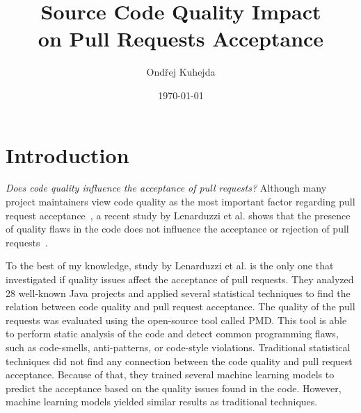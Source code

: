 \documentclass[digital,oneside,oldtable,nolof,nolot,nocover]{fithesis4}
\author{Ondřej Kuhejda}
\date{\today}
\title{Source Code Quality Impact \\ on Pull Requests Acceptance}
\begin{document}
\chapter{Introduction}
\label{sec:org70c3bc9}
\emph{Does code quality influence the acceptance of pull requests?} Although many
project maintainers view code quality as the most important factor regarding
pull request acceptance~\cite{integrator}, a recent study by Lenarduzzi et al.
shows that the presence of quality flaws in the code does not influence the
acceptance or rejection of pull requests~\cite{quality}.

To the best of my knowledge, study by Lenarduzzi et al. is the only one that
investigated if quality issues affect the acceptance of pull requests. They
analyzed 28 well-known Java projects and applied several statistical
techniques to find the relation between code quality and pull request
acceptance. The quality of the pull requests was evaluated using the
open-source tool called PMD. This tool is able to perform static analysis of
the code and detect common programming flaws, such as code-smells,
anti-patterns, or code-style violations. Traditional statistical techniques
did not find any connection between the code quality and pull request
acceptance. Because of that, they trained several machine learning models to
predict the acceptance based on the quality issues found in the code. However,
machine learning models yielded similar results as traditional techniques.
\end{document}
